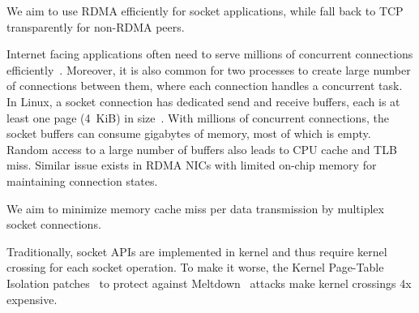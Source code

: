We aim to use RDMA efficiently for socket applications, while fall back to TCP transparently for non-RDMA peers.

Internet facing applications often need to serve millions of concurrent connections efficiently~\cite{nishtala2013scaling,lin2016scalable,belay2017ix}.
Moreover, it is also common for two processes to create large number of connections between them, where each connection handles a concurrent task.
In Linux, a socket connection has dedicated send and receive buffers, each is at least one page (4~KiB) in size~\cite{davidskbs}. With millions of concurrent connections, the socket buffers can consume gigabytes of memory, most of which is empty.
Random access to a large number of buffers also leads to CPU cache and TLB miss.
Similar issue exists in RDMA NICs with limited on-chip memory for maintaining connection states.

We aim to minimize memory cache miss per data transmission by multiplex socket connections.


Traditionally, socket APIs are implemented in kernel and thus require kernel crossing for each socket operation.
To make it worse, the Kernel Page-Table Isolation patches~\cite{kpti} to protect against Meltdown~\cite{Lipp2018meltdown} attacks make kernel crossings 4x expensive.


